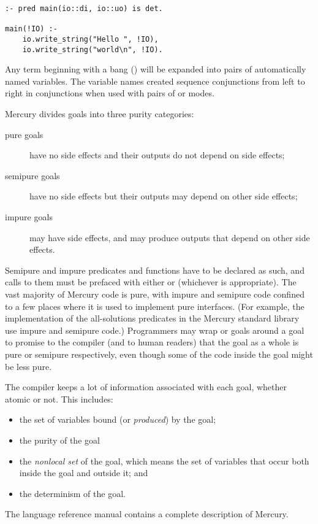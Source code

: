 \begin{verbatim}
:- pred main(io::di, io::uo) is det.

main(!IO) :-
    io.write_string("Hello ", !IO),
    io.write_string("world\n", !IO).
\end{verbatim}

\noindent
Any term beginning with a bang (\code{!})
will be expanded into pairs of automatically named
variables.
The variable names created sequence conjunctions from left to right in
conjunctions when used with pairs of  or 
modes.

\label{page:purity}
Mercury divides goals into three purity categories:

\begin{description}

    \item[pure goals] have no side effects
    and their outputs do not depend on side effects;

    \item[semipure goals] have no side effects
    but their outputs may depend on other side effects;

    \item[impure goals] may have side effects, and may produce outputs
      that depend on other side effects.

\end{description}

\noindent
Semipure and impure predicates and functions
have to be declared as such,
and calls to them must be prefaced with either
 or  (whichever is appropriate).
The vast majority of Mercury code is pure,
with impure and semipure code confined to a few places
where it is used to implement pure interfaces.
(For example, the implementation of the all-solutions predicates
in the Mercury standard library use impure and semipure code.)
Programmers may wrap
 or  goals around a goal
to promise to the compiler (and to human readers) that
the goal as a whole is pure or semipure respectively,
even though some of the code inside the goal might be less pure.

The compiler keeps a lot of information associated with each goal,
whether atomic or not.
This includes:

\begin{itemize}
\item
the set of variables bound (or \emph{produced}) by the goal;
\item
the purity of the goal
\item
the \emph{nonlocal set} of the goal,
which means the set of variables
that occur both inside the goal and outside it; and
\item
the determinism of the goal.
\end{itemize}

\noindent
The language reference manual \citep{mercury_refman} contains a complete
description of Mercury.

